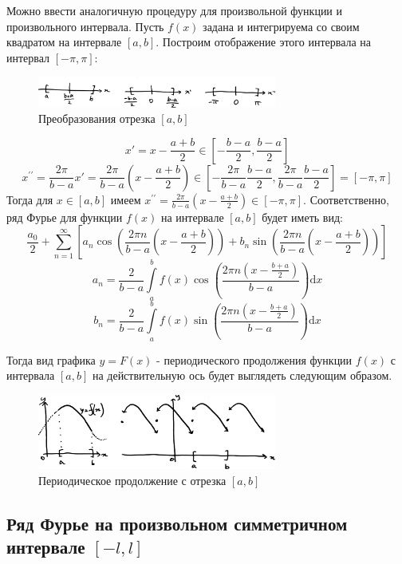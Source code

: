 \documentclass[12pt, a4paper]{article}
\newcommand{\di}{\mathrm{d}}
\begin{document}
Можно ввести аналогичную процедуру для произвольной функции и произвольного интервала. Пусть $f(x)$ задана и интегрируема со своим квадратом на интервале $[a, b]$. Построим отображение этого интервала на интервал $[-\pi, \pi]$:

\begin{figure}[h]
 \centering
 \includegraphics[width=0.7\textwidth]{14}
 \vspace{-4mm}
  \caption{Преобразования отрезка $[a,b]$}
\end{figure}

\[x' = x - \frac{a+b}{2} \in \left[ -\frac{b-a}{2}, \frac{b-a}{2} \right] \]
\[x^{\prime \prime} = \frac{2\pi}{b-a} x' = \frac{2\pi}{b-a} \left( x - \frac{a+b}{2} \right) \in \left[ -\frac{2\pi}{b-a} \frac{b-a}{2}, \frac{2\pi}{b-a} \frac{b-a}{2} \right] = [-\pi, \pi] \]
Тогда для $x \in [a, b]$ имеем $x^{\prime \prime} = \frac{2\pi}{b-a} \left( x - \frac{a+b}{2} \right) \in [-\pi, \pi]$. Соответственно, ряд Фурье для функции $f(x)$ на интервале $[a, b]$ будет иметь вид:
\[\frac{a_0}{2} + \sum_{n=1}^{\infty} \left[ a_n \cos \left( \frac{2\pi n}{b-a} \left( x - \frac{a+b}{2} \right) \right) + b_n \sin \left( \frac{2\pi n}{b-a} \left( x - \frac{a+b}{2} \right) \right) \right] \]
\[a_n = \frac{2}{b-a} \int \limits_a^b f(x) \cos \left( \frac{2\pi n \left( x - \frac{b+a}{2} \right)}{b-a} \right) \di x \]
\[b_n = \frac{2}{b-a} \int \limits_a^b f(x) \sin \left( \frac{2\pi n \left( x - \frac{b+a}{2} \right)}{b-a} \right) \di x \]

Тогда вид графика $y = F(x)$ - периодического продолжения функции $f(x)$ с интервала $[a, b]$ на действительную ось будет выглядеть следующим образом.

\begin{figure}[h]
 \centering
 \includegraphics[width=0.7\textwidth]{15}
 \vspace{-4mm}
  \caption{Периодическое продолжение с отрезка $[a,b]$}
\end{figure}

\subsection{Ряд Фурье на произвольном симметричном интервале $[-l, l]$}
\end{document}
